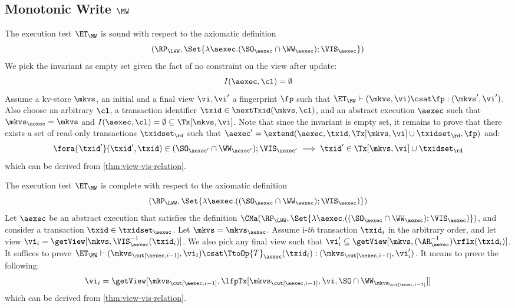 \subsection{Monotonic Write \( \MW \)}
\label{sec:sound-complete-mw}

The execution test $\ET_\MW$ is sound with respect to the axiomatic definition \cite{surech-session-guarantee}
\[(\RP_{\LWW}, \Set{\lambda \aexec. ( \SO_{\aexec} \cap \WW_\aexec ) ; \VIS_{\aexec} })\]
We pick the invariant as empty set given the fact of no constraint on the view after update:
\[ 
    I( \aexec, \cl ) = \emptyset 
\]
Assume a kv-store $\mkvs$, an initial and a final view $\vi, \vi'$  a fingerprint $\fp$ 
such that $\ET_{\MW} \vdash (\mkvs, \vi) \csat \fp: (\mkvs',\vi')$. 
Also choose an arbitrary $\cl$, a transaction identifier $\txid \in \nextTxid(\mkvs, \cl)$, 
and an abstract execution $\aexec$ such that $\mkvs_{\aexec} = \mkvs$ and 
\( I(\aexec, \cl) =  \emptyset \subseteq \Tx[\mkvs, \vi] \).
Note that since the invariant  is empty set, it remains to prove that there exists a set of read-only transactions \( \txidset_\rd \) such that
\( \aexec' = \extend(\aexec, \txid, \Tx[\mkvs, \vi] \cup \txidset_\rd, \fp ) \) and:
\[
    \begin{array}{@{}l@{}}
        \fora{ \txid' }  (\txid' ,\txid)  \in ( \SO_{\aexec'} \cap \WW_{\aexec'} ) ; \VIS_{\aexec'}
        \implies \txid' \in \Tx[\mkvs, \vi] \cup \txidset_\rd
    \end{array}
\]
which can be derived from \cref{thm:view-vis-relation}.

The execution test $\ET_{\MW}$ is complete with respect to 
the axiomatic definition
\[(\RP_{\LWW}, \Set{\lambda \aexec.(( \SO_{\aexec} \cap \WW_{\aexec} ) ; \VIS_{\aexec})})\]
Let $\aexec$ be an abstract execution that satisfies the definition
$\CMa(\RP_{\LWW}, \Set{\lambda \aexec.(( \SO_{\aexec} \cap \WW_{\aexec} ) ; \VIS_{\aexec})})$, 
and consider a transaction $\txid \in \txidset_{\aexec}$. 
Let \( \mkvs = \mkvs_\aexec \).
Assume i-\emph{th} transaction \( \txid_i \) in the arbitrary order,
and let view \( \vi_{i} = \getView[\mkvs, \VIS^{-1}_{\aexec}(\txid_{i})] \).
We also pick any final view such that \( \vi'_{i} \subseteq \getView[\mkvs, (\AR^{-1}_{\aexec})\rflx(\txid_{i})] \).
It suffices to prove \( \ET_\MW \vdash (\mkvs_{\cut[\aexec, i-1]}, \vi_i ) \csat  \TtoOp{T}_{\aexec}(\txid_{i}) : (\mkvs_{\cut[\aexec, i-1]}, \vi'_{i}) \).
It means to prove the following:
\[
    \vi_i = \getView[\mkvs_{\cut[\aexec, i-1]}, \lfpTx[\mkvs_{\cut[\aexec, i-1]},\vi,\SO \cap \WW_{\mkvs_{\cut[\aexec, i-1]}}]]
\]
which can be derived from \cref{thm:view-vis-relation}.
